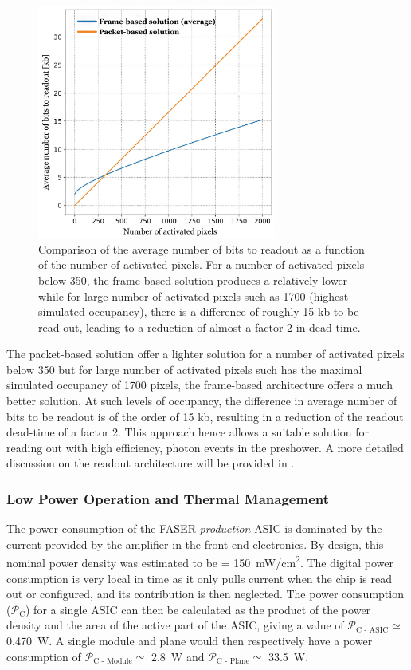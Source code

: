 		\begin{figure}[h]
			\centering
			\includegraphics[width=0.7\textwidth]{files/readout_data_size}
			\caption{Comparison of the average number of bits to readout as a function of the number of activated pixels. For a number of activated pixels below 350, the frame-based solution produces a relatively lower while for large number of activated pixels such as 1700 (highest simulated occupancy), there is a difference of roughly 15 kb to be read out, leading to a reduction of almost a factor 2 in dead-time.}
			\label{im:readout_data_size}
		\end{figure}
		
		The packet-based solution offer a lighter solution for a number of activated pixels below 350 but for large number of activated pixels such has the maximal simulated occupancy of 1700 pixels, the frame-based architecture offers a much better solution. At such levels of occupancy, the difference in average number of bits to be readout is of the order of 15 kb, resulting in a reduction of the readout dead-time of a factor 2. This approach hence allows a suitable solution for reading out with high efficiency, photon events in the preshower. A more detailed discussion on the readout architecture will be provided in .
		
		\subsubsection{Low Power Operation and Thermal Management}
		The power consumption of the FASER \textit{production} ASIC is dominated by the current provided by the amplifier in the front-end electronics. By design, this nominal power density was estimated to be \power = \SI{150}{\milli\watt/\centi\meter\squared}. The digital power consumption is very local in time as it only pulls current when the chip is read out or configured, and its contribution is then neglected. The power consumption ($\mathcal{P}_{\text{C}}$) for a single ASIC can then be calculated as the product of the power density and the area of the active part of the ASIC, giving a value of $\mathcal{P}_{\text{C - ASIC}} \simeq $ \SI{0.470}{\watt}. A single module and plane would then respectively have a power consumption of $\mathcal{P}_{\text{C - Module}} \simeq $ \SI{2.8}{\watt} and $\mathcal{P}_{\text{C - Plane}} \simeq $ \SI{33.5}{\watt}.
		
